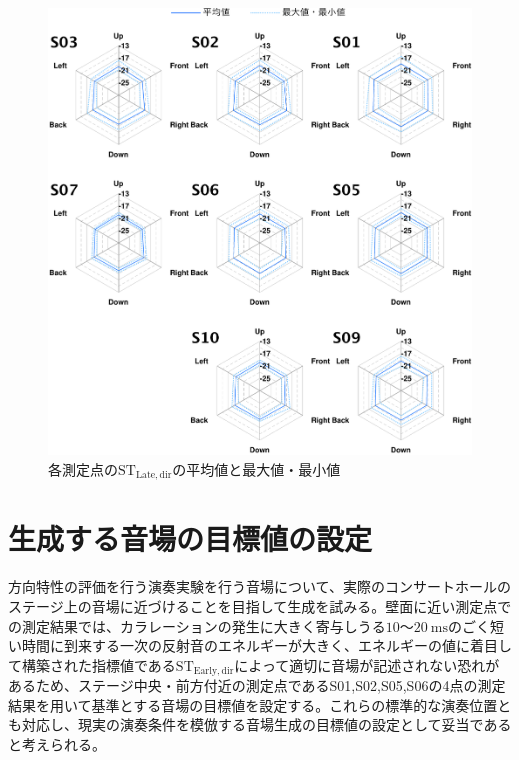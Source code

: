 \documentclass[11pt,a4j]{jreport}
\begin{document}
\newpage
{}
\begin{figure}[htbp]
  \centering
  \includegraphics[scale=.8]{images/realHallDirSt/realHallOverall/eachPointLate.pdf}
  \caption{各測定点の$\mathrm{ST_{Late,dir}}$の平均値と最大値・最小値}
  \label{fig:各測定位置のSTLateの平均値と最大値・最小値}
\end{figure}

\newpage
\section{生成する音場の目標値の設定}
方向特性の評価を行う演奏実験を行う音場について、実際のコンサートホールのステージ上の音場に近づけることを目指して生成を試みる。壁面に近い測定点での測定結果では、カラレーションの発生に大きく寄与しうる$10$～$\SI{20}{\ms}$のごく短い時間に到来する一次の反射音のエネルギーが大きく、エネルギーの値に着目して構築された指標値である$\mathrm{ST_{Early,dir}}$によって適切に音場が記述されない恐れがあるため、ステージ中央・前方付近の測定点であるS01,S02,S05,S06の4点の測定結果を用いて基準とする音場の目標値を設定する。これらの標準的な演奏位置とも対応し、現実の演奏条件を模倣する音場生成の目標値の設定として妥当であると考えられる。
\end{document}

